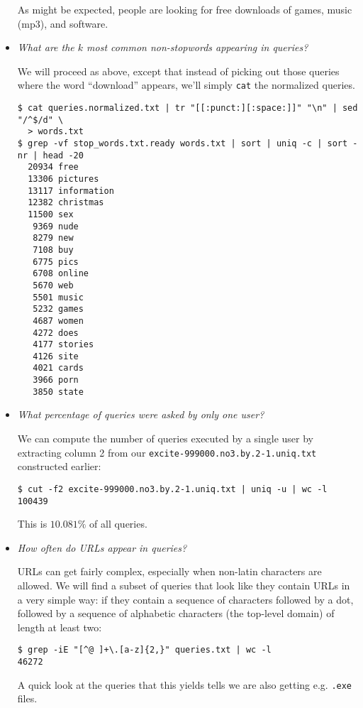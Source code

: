 \begin{itemize}
As might be expected, people are looking for free downloads of games, music
(mp3), and software. 

\item \emph{What are the $k$ most common non-stopwords appearing in queries?}

We will proceed as above, except that instead of picking out those queries
where the word ``download'' appears, we'll simply \texttt{cat} the normalized
queries.

\begin{lstlisting}
$ cat queries.normalized.txt | tr "[[:punct:][:space:]]" "\n" | sed "/^$/d" \
  > words.txt
$ grep -vf stop_words.txt.ready words.txt | sort | uniq -c | sort -nr | head -20
  20934 free
  13306 pictures
  13117 information
  12382 christmas
  11500 sex
   9369 nude
   8279 new
   7108 buy
   6775 pics
   6708 online
   5670 web
   5501 music
   5232 games
   4687 women
   4272 does
   4177 stories
   4126 site
   4021 cards
   3966 porn
   3850 state
\end{lstlisting}

\item \emph{What percentage of queries were asked by only one user?}

We can compute the number of queries executed by a single user by extracting
column 2 from our \texttt{excite-999000.no3.by.2-1.uniq.txt} constructed
earlier:

\begin{lstlisting}
$ cut -f2 excite-999000.no3.by.2-1.uniq.txt | uniq -u | wc -l
100439
\end{lstlisting}

This is $10.081\%$ of all queries.

\item \emph{How often do URLs appear in queries?}

URLs can get fairly complex, especially when non-latin characters are allowed.
We will find a subset of queries that look like they contain URLs in a very
simple way: if they contain a sequence of characters followed by a dot,
followed by a sequence of alphabetic characters (the top-level domain) of
length at least two:

\begin{lstlisting}
$ grep -iE "[^@ ]+\.[a-z]{2,}" queries.txt | wc -l
46272
\end{lstlisting}

A quick look at the queries that this yields tells we are also getting e.g.
\texttt{.exe} files.


\end{itemize}
